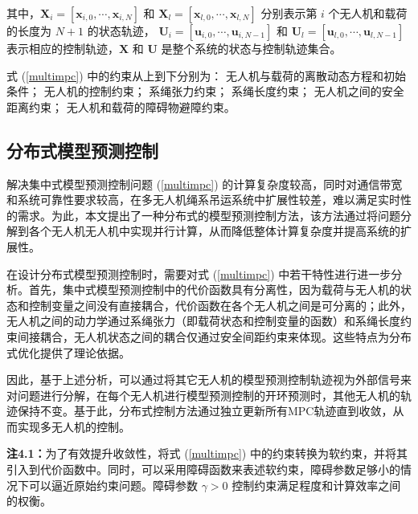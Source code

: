 \documentclass[lang=chs, degree=master, blindreview=true, winfonts=true]{yanputhesis}
\begin{document}
其中，\( \bm X_i = \left[ \bm x_{i,0}, \cdots, \bm x_{i,N} \right] \) 和 \( \bm X_l = \left[ \bm x_{l,0}, \cdots, \bm x_{l,N} \right] \) 分别表示第 \( i \) 个无人机和载荷的长度为 \( N+1 \) 的状态轨迹，
\( \bm U_i = \left[ \bm u_{i,0}, \cdots, \bm u_{i,{N-1}} \right] \) 和 \( \bm U_l = \left[ \bm u_{l,0}, \cdots, \bm u_{l,{N-1}} \right] \) 表示相应的控制轨迹，\( \bm X \) 和 \( \bm U \) 是整个系统的状态与控制轨迹集合。

式 (\ref{multimpc}) 中的约束从上到下分别为：
无人机与载荷的离散动态方程和初始条件；
无人机的控制约束；
系绳张力约束；
系绳长度约束；
无人机之间的安全距离约束；
无人机和载荷的障碍物避障约束。

\subsection{分布式模型预测控制}
解决集中式模型预测控制问题 (\ref{multimpc}) 的计算复杂度较高，同时对通信带宽和系统可靠性要求较高，在多无人机绳系吊运系统中扩展性较差，难以满足实时性的需求。为此，本文提出了一种分布式的模型预测控制方法，该方法通过将问题分解到各个无人机无人机中实现并行计算，从而降低整体计算复杂度并提高系统的扩展性。

在设计分布式模型预测控制时，需要对式 (\ref{multimpc}) 中若干特性进行进一步分析。首先，集中式模型预测控制中的代价函数具有分离性，因为载荷与无人机的状态和控制变量之间没有直接耦合，代价函数在各个无人机之间是可分离的；此外，无人机之间的动力学通过系绳张力（即载荷状态和控制变量的函数）和系绳长度约束间接耦合，无人机状态之间的耦合仅通过安全间距约束来体现。这些特点为分布式优化提供了理论依据。

因此，基于上述分析，可以通过将其它无人机的模型预测控制轨迹视为外部信号来对问题进行分解，在每个无人机进行模型预测控制的开环预测时，其他无人机的轨迹保持不变。基于此，分布式控制方法通过独立更新所有MPC轨迹直到收敛，从而实现多无人机的控制。

\textbf{注4.1：}为了有效提升收敛性，将式 (\ref{multimpc}) 中的约束转换为软约束，并将其引入到代价函数中。同时，可以采用障碍函数来表述软约束，障碍参数足够小的情况下可以逼近原始约束问题。障碍参数 $\gamma > 0$ 控制约束满足程度和计算效率之间的权衡。




\end{document}
